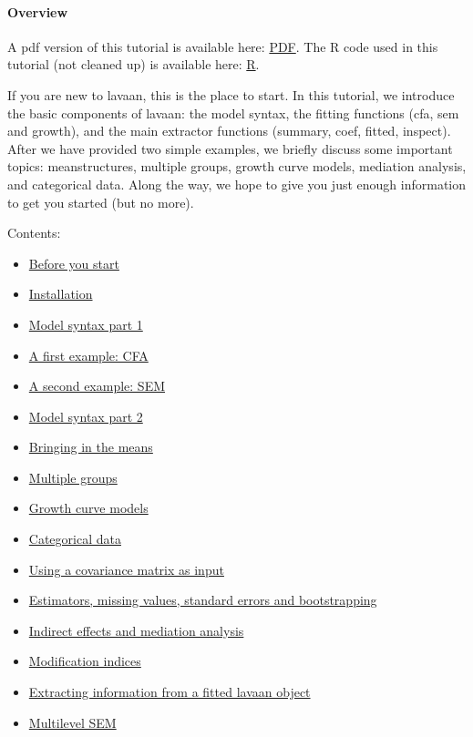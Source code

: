 \hypertarget{overview}{%
\paragraph{Overview}\label{overview}}

A pdf version of this tutorial is available here:
\href{/tutorial/tutorial.pdf}{PDF}. The R code used in this tutorial
(not cleaned up) is available here: \href{/tutorial/tutorial.R}{R}.

If you are new to lavaan, this is the place to start. In this tutorial,
we introduce the basic components of lavaan: the model syntax, the
fitting functions (cfa, sem and growth), and the main extractor
functions (summary, coef, fitted, inspect). After we have provided two
simple examples, we briefly discuss some important topics:
meanstructures, multiple groups, growth curve models, mediation
analysis, and categorical data. Along the way, we hope to give you just
enough information to get you started (but no more).

Contents:

\begin{itemize}
\tightlist
\item
  \href{/tutorial/before.html}{Before you start}
\item
  \href{/tutorial/install.html}{Installation}
\item
  \href{/tutorial/syntax1.html}{Model syntax part 1}
\item
  \href{/tutorial/cfa.html}{A first example: CFA}
\item
  \href{/tutorial/sem.html}{A second example: SEM}
\item
  \href{/tutorial/syntax2.html}{Model syntax part 2}
\item
  \href{/tutorial/means.html}{Bringing in the means}
\item
  \href{/tutorial/groups.html}{Multiple groups}
\item
  \href{/tutorial/growth.html}{Growth curve models}
\item
  \href{/tutorial/cat.html}{Categorical data}
\item
  \href{/tutorial/cov.html}{Using a covariance matrix as input}
\item
  \href{/tutorial/est.html}{Estimators, missing values, standard errors
  and bootstrapping}
\item
  \href{/tutorial/mediation.html}{Indirect effects and mediation
  analysis}
\item
  \href{/tutorial/modindices.html}{Modification indices}
\item
  \href{/tutorial/inspect.html}{Extracting information from a fitted
  lavaan object}
\item
  \href{/tutorial/multilevel.html}{Multilevel SEM}
\end{itemize}
